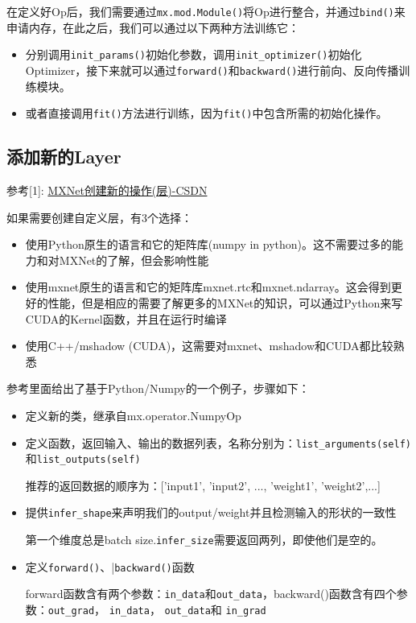 在定义好Op后，我们需要通过\verb|mx.mod.Module()|将Op进行整合，并通过\verb|bind()|来申请内存，在此之后，我们可以通过以下两种方法训练它：
\begin{itemize}
\item 分别调用\verb|init_params()|初始化参数，调用\verb|init_optimizer()|初始化Optimizer，接下来就可以通过\verb|forward()|和\verb|backward()|进行前向、反向传播训练模块。
\item 或者直接调用\verb|fit()|方法进行训练，因为\verb|fit()|中包含所需的初始化操作。
\end{itemize}

\subsection{添加新的Layer}

参考[1]: \href{https://blog.csdn.net/qq_25491201/article/details/51284416}{MXNet创建新的操作(层)-CSDN}

如果需要创建自定义层，有3个选择：

\begin{itemize}
\item 使用Python原生的语言和它的矩阵库(numpy in python)。这不需要过多的能力和对MXNet的了解，但会影响性能
\item 使用mxnet原生的语言和它的矩阵库mxnet.rtc和mxnet.ndarray。这会得到更好的性能，但是相应的需要了解更多的MXNet的知识，可以通过Python来写CUDA的Kernel函数，并且在运行时编译
\item 使用C++/mshadow (CUDA)，这需要对mxnet、mshadow和CUDA都比较熟悉
\end{itemize}

参考里面给出了基于Python/Numpy的一个例子，步骤如下：

\begin{itemize}
\item 定义新的类，继承自mx.operator.NumpyOp
\item 定义函数，返回输入、输出的数据列表，名称分别为：\verb|list_arguments(self)|和\verb|list_outputs(self)|

推荐的返回数据的顺序为：['input1', 'input2', ..., 'weight1', 'weight2',...]

\item 提供\verb|infer_shape|来声明我们的output/weight并且检测输入的形状的一致性

第一个维度总是batch size.\verb|infer_size|需要返回两列，即使他们是空的。

\item 定义\verb|forward()|、|\verb|backward()|函数

forward函数含有两个参数：\verb|in_data|和\verb|out_data|，backward()函数含有四个参数：\verb|out_grad|， \verb|in_data|， \verb|out_data|和 \verb|in_grad|

\end{itemize}

